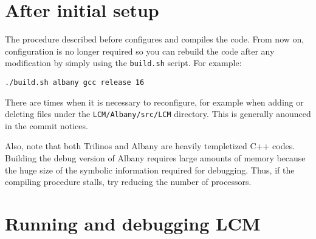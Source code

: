 \documentclass[10pt,a4paper]{article} \usepackage[utf8]{inputenc}
\begin{document}
\section{After initial setup}
The procedure described before configures and compiles the code. From
now on, configuration is no longer required so you can rebuild the
code after any modification by simply using the \verb+build.sh+
script. For example:
\begin{verbatim}
./build.sh albany gcc release 16
\end{verbatim}

There are times when it is necessary to reconfigure, for example when
adding or deleting files under the \verb+LCM/Albany/src/LCM+
directory. This is generally anounced in the commit notices.

Also, note that both Trilinos and Albany are heavily templetized C++
codes. Building the debug version of Albany requires large amounts of
memory because the huge size of the symbolic information required for
debugging. Thus, if the compiling procedure stalls, try reducing the
number of processors.

\section{Running and debugging LCM} 
\end{document}
